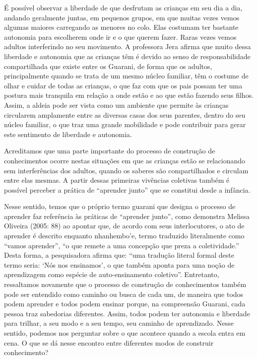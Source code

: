 É possível observar a liberdade de que desfrutam as crianças em seu dia a
dia, andando geralmente juntas, em pequenos grupos, em que muitas vezes
vemos algumas maiores carregando as menores no colo. Elas costumam ter
bastante autonomia para escolherem onde ir e o que querem fazer. Raras
vezes vemos adultos interferindo no seu movimento. A professora Jera
afirma que muito dessa liberdade e autonomia que as crianças têm é
devido ao senso de responsabilidade compartilhada que existe entre os
Guarani, de forma que os adultos, principalmente quando se trata de um
mesmo núcleo familiar, têm o costume de olhar e cuidar de todas as
crianças, o que faz com que os pais possam ter uma postura mais
tranquila em relação a onde estão e ao que estão fazendo seus filhos.
Assim, a aldeia pode ser vista como um ambiente que permite às crianças
circularem amplamente entre as diversas casas dos seus parentes, dentro
do seu núcleo familiar, o que traz uma grande mobilidade e pode
contribuir para gerar este sentimento de liberdade e autonomia. 

Acreditamos que uma parte importante do processo de construção de
conhecimentos ocorre nestas situações em que as crianças estão se
relacionando sem interferências dos adultos, quando os saberes são
compartilhados e circulam entre elas mesmas. A partir dessas primeiras
vivências coletivas também é possível perceber a prática de ``aprender
junto'' que se constitui desde a infância.

Nesse sentido, temos que o próprio termo guarani que designa o processo
de aprender faz referência às práticas de ``aprender junto'', como
demonstra  Melissa Oliveira (2005: 88) ao apontar que, de acordo com
seus interlocutores, o ato de aprender é descrito enquanto nhanhembo’e,
termo traduzido literalmente como ``vamos aprender'', ``o que remete a uma
concepção que preza a coletividade.'' Desta forma, a pesquisadora afirma
que: ``uma tradução literal formal deste termo seria: ‘Nós nos
ensinamos’, o que também aponta para uma noção de aprendizagem como
espécie de auto-ensinamento coletivo''. Entretanto, ressaltamos
novamente que o processo de construção de conhecimentos também pode ser
entendido como caminho ou busca de cada um, de maneira que todos podem
aprender e todos podem ensinar porque, na compreensão Guarani, cada
pessoa traz sabedorias diferentes. Assim, todos podem ter autonomia e
liberdade para trilhar, a seu modo e a seu tempo, seu caminho de
aprendizado. Nesse sentido, podemos nos perguntar sobre o que acontece
quando a escola entra em cena. O que se dá nesse encontro entre
diferentes modos de construir conhecimento?


